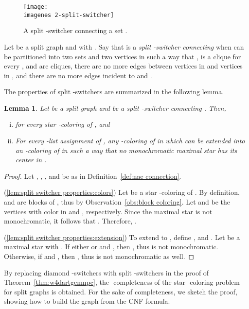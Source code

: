 \documentclass[a4paper, 11pt, oneside]{article}
\newtheorem{lemma}[theorem]{Lemma}
\let\Definition=\emph
\def\imagenes{}
\begin{document}
\begin{figure}
 \centering\texttt{[image: \\imagenes 2-split-switcher]}
 \caption{A split -switcher connecting a set .}\label{fig:split-switcher}
\end{figure}


\begin{defn}\label{def:nae connection}
  Let  be a split graph and  with .  Say that  is a \Definition{split -switcher connecting } when  can be partitioned into two sets  and two vertices  in such a way that ,  is a clique for every ,  and  are cliques, there are no more edges between vertices in  and vertices in , and there are no more edges incident to  and .
\end{defn}

The properties of split -switchers are summarized in the following lemma.

\begin{lemma}\label{lem:split switcher properties}
 Let  be a split graph and  be a split -switcher connecting . Then,
\begin{enumerate}[(i)]
  \item  for every star -coloring  of , and\label{lem:split switcher properties:colors}
  \item For every -list assignment of , any -coloring  of  in which  can be extended into an -coloring of  in such a way that no monochromatic maximal star has its center in .\label{lem:split switcher properties:extension}
\end{enumerate}
\end{lemma}

\begin{proof}
 Let , , , and  be as in Definition~\ref{def:nae connection}.
 
 (\ref{lem:split switcher properties:colors}) Let  be a star -coloring of .  By definition,  and  are blocks of , thus  by Observation~\ref{obs:block coloring}.  Let  and  be the vertices with color  in  and , respectively.  Since the maximal star  is not monochromatic, it follows that .  Therefore, .
 
 (\ref{lem:split switcher properties:extension}) To extend  to , define , and .  Let  be a maximal star with .  If either  or  and , then , thus  is not monochromatic.  Otherwise, if  and , then , thus  is not monochromatic as well.
\end{proof}

By replacing diamond -switchers with split -switchers in the proof of Theorem~\ref{thm:w4dartgemnpc}, the -completeness of the star -coloring problem for split graphs is obtained.  For the sake of completeness, we sketch the proof, showing how to build the graph  from the CNF formula.
\end{document}
